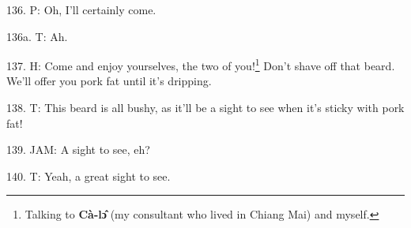 136. P: Oh, I'll certainly come.

136a. T: Ah.

137. H: Come and enjoy yourselves, the two of you!\footnote{Talking to \textbf{Cà-lɔ̂} (my consultant who lived in Chiang Mai) and myself.} Don't shave off that beard.
We'll offer you pork fat until it's dripping.

138. T: This beard is all bushy, as it'll be a sight to see when it's sticky with
pork fat!

139. JAM: A sight to see, eh?

140. T: Yeah, a great sight to see.

